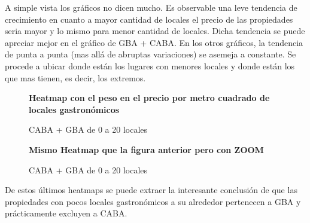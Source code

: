 \documentclass[a4paper, 10pt]{article}
\begin{document}
				A simple vista los gráficos no dicen mucho. Es observable una leve tendencia de 
				crecimiento en cuanto a mayor cantidad de locales el precio de las propiedades 
				seria mayor y lo mismo para menor cantidad de locales. Dicha tendencia se puede 
				apreciar mejor en el gráfico de GBA + CABA. En los otros gráficos, la tendencia 
				de punta a punta (mas allá de abruptas variaciones) se asemeja a constante.  
				Se procede a ubicar donde están los lugares con menores locales y donde están 
				los que mas tienen, es decir, los extremos.
				
				\begin{figure}
    				\centering
    				\textbf{Heatmap con el peso en el precio por metro cuadrado de locales gastronómicos}\par\medskip
    				\caption{CABA + GBA de 0 a 20 locales}
				\end{figure}				
				\begin{figure}
    				\centering
    				\textbf{Mismo Heatmap que la figura anterior pero con ZOOM}\par\medskip
    				\caption{CABA + GBA de 0 a 20 locales}
				\end{figure}
				\FloatBarrier				
				
				De estos últimos heatmaps se puede extraer la interesante conclusión de que 
				las propiedades con pocos locales gastronómicos a su alrededor pertenecen a 
				GBA y prácticamente excluyen a CABA.				
								
\end{document}
